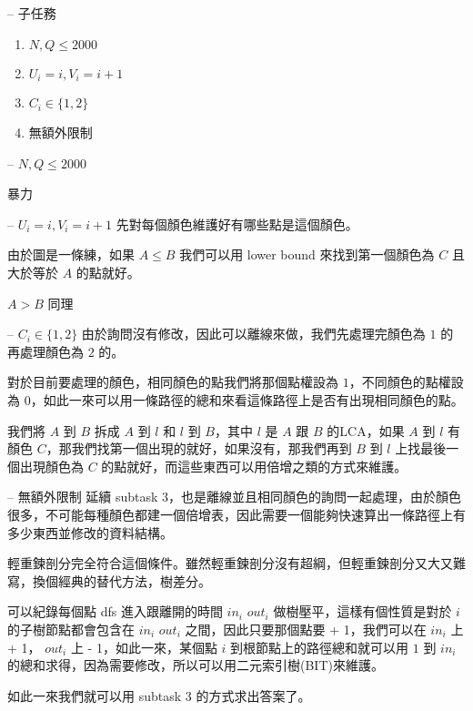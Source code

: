 \documentclass[hyperref,UTF8,notheorems,xcolor={dvipsnames}]{beamer}
\newcommand{\btitle}[1]{{\secname} -- #1}
\theoremstyle{definition}
\begin{document}
\begin{frame}[fragile]{\btitle{子任務}}
	\begin{enumerate}
		\item $N, Q \le 2000$
		\item $U_i = i, V_i = i + 1$
		\item $C_i \in \{1, 2\}$
		\item 無額外限制
	\end{enumerate}
\end{frame}

\begin{frame}[fragile]{\btitle{$N, Q \le 2000$}}

	暴力

\end{frame}

\begin{frame}[fragile]{\btitle{$U_i = i, V_i = i + 1$}}
	先對每個顏色維護好有哪些點是這個顏色。
	\pause
	
	由於圖是一條練，如果 $A \le B$ 我們可以用 lower bound 來找到第一個顏色為 $C$ 且大於等於 $A$ 的點就好。 

	$A > B$ 同理

\end{frame}

\begin{frame}[fragile]{\btitle{$C_i \in \{1, 2\}$}}
	由於詢問沒有修改，因此可以離線來做，我們先處理完顏色為 $1$ 的再處理顏色為 $2$ 的。
	\pause

	對於目前要處理的顏色，相同顏色的點我們將那個點權設為 $1$，不同顏色的點權設為 $0$，如此一來可以用一條路徑的總和來看這條路徑上是否有出現相同顏色的點。
	\pause

	我們將 $A$ 到 $B$ 拆成 $A$ 到 $l$ 和 $l$ 到 $B$，其中 $l$ 是 $A$ 跟 $B$ 的LCA，如果 $A$ 到 $l$ 有顏色 $C$，那我們找第一個出現的就好，如果沒有，那我們再到 $B$ 到 $l$ 上找最後一個出現顏色為 $C$ 的點就好，而這些東西可以用倍增之類的方式來維護。
\end{frame}

\begin{frame}[fragile]{\btitle{無額外限制}}
	延續 subtask 3，也是離線並且相同顏色的詢問一起處理，由於顏色很多，不可能每種顏色都建一個倍增表，因此需要一個能夠快速算出一條路徑上有多少東西並修改的資料結構。
	\pause

	輕重鍊剖分完全符合這個條件。雖然輕重鍊剖分沒有超綱，但輕重鍊剖分又大又難寫，換個經典的替代方法，樹差分。
	\pause
	
	可以紀錄每個點 dfs 進入跟離開的時間 $in_i$ $out_i$ 做樹壓平，這樣有個性質是對於 $i$ 的子樹節點都會包含在 $in_i$ $out_i$ 之間，因此只要那個點要 + 1，我們可以在 $in_i$ 上 + 1， $out_i$ 上 - 1，如此一來，某個點 $i$ 到根節點上的路徑總和就可以用 $1$ 到 $in_i$ 的總和求得，因為需要修改，所以可以用二元索引樹(BIT)來維護。

	如此一來我們就可以用 subtask 3 的方式求出答案了。
\end{frame}
\end{document}
